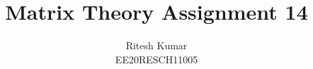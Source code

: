 \documentclass[journal,12pt,twocolumn]{IEEEtran}
\DeclareMathOperator*{\Res}{Res}
\begin{document}
	
	
	\newtheorem{theorem}{Theorem}[section]
	\newtheorem{problem}{Problem}
	\newtheorem{proposition}{Proposition}[section]
	\newtheorem{lemma}{Lemma}[section]
	\newtheorem{corollary}[theorem]{Corollary}
	\newtheorem{example}{Example}[section]
	\newtheorem{definition}[problem]{Definition}
	\newcommand\bigZero[1][17]{\mbox{\fontsize{#1}{0}\selectfont$0$}}
	\newcommand{\BEQA}{\begin{eqnarray}}
	\newcommand{\EEQA}{\end{eqnarray}}
	\newcommand{\define}{\stackrel{\triangle}{=}}
	
	\providecommand{\mbf}{\mathbf}
	\providecommand{\pr}[1]{\ensuremath{\Pr\left(#1\right)}}
	\providecommand{\qfunc}[1]{\ensuremath{Q\left(#1\right)}}
	\providecommand{\sbrak}[1]{\ensuremath{{}\left[#1\right]}}
	\providecommand{\lsbrak}[1]{\ensuremath{{}\left[#1\right.}}
	\providecommand{\rsbrak}[1]{\ensuremath{{}\left.#1\right]}}
	\providecommand{\brak}[1]{\ensuremath{\left(#1\right)}}
	\providecommand{\lbrak}[1]{\ensuremath{\left(#1\right.}}
	\providecommand{\rbrak}[1]{\ensuremath{\left.#1\right)}}
	\providecommand{\cbrak}[1]{\ensuremath{\left\{#1\right\}}}
	\providecommand{\lcbrak}[1]{\ensuremath{\left\{#1\right.}}
	\providecommand{\rcbrak}[1]{\ensuremath{\left.#1\right\}}}
	\theoremstyle{remark}
	\newtheorem{rem}{Remark}
	\newcommand{\sgn}{\mathop{\mathrm{sgn}}}
	\providecommand{\abs}[1]{\left\vert#1\right\vert}
	\providecommand{\res}[1]{\Res\displaylimits_{#1}} 
	\providecommand{\norm}[1]{\left\lVert#1\right\rVert}
	\providecommand{\mtx}[1]{\mathbf{#1}}
	\providecommand{\mean}[1]{E\left[ #1 \right]}
	\providecommand{\fourier}{\overset{\mathcal{F}}{ \rightleftharpoons}}
	\providecommand{\system}{\overset{\mathcal{H}}{ \longleftrightarrow}}
	\newcommand{\solution}{\noindent \textbf{Solution: }}
	\newcommand{\cosec}{\,\text{cosec}\,}
	\providecommand{\dec}[2]{\ensuremath{\overset{#1}{\underset{#2}{\gtrless}}}}
	\newcommand{\myvec}[1]{\ensuremath{\begin{pmatrix}#1\end{pmatrix}}}
	\newcommand{\mydet}[1]{\ensuremath{\begin{vmatrix}#1\end{vmatrix}}}
	\makeatletter
	\makeatother
	\let\StandardTheFigure\thefigure
	\let\vec\mathbf
	\renewcommand{\thefigure}{\theproblem}
	\def\putbox#1#2#3{\makebox[0in][l]{\makebox[#1][l]{}\raisebox{\baselineskip}[0in][0in]{\raisebox{#2}[0in][0in]{#3}}}}
	\def\rightbox#1{\makebox[0in][r]{#1}}
	\def\centbox#1{\makebox[0in]{#1}}
	\def\topbox#1{\raisebox{-\baselineskip}[0in][0in]{#1}}
	\def\midbox#1{\raisebox{-0.5\baselineskip}[0in][0in]{#1}}
	\vspace{3cm}
	\title{Matrix Theory Assignment 14}
	\author{Ritesh Kumar \\ EE20RESCH11005}
	
\end{document}

